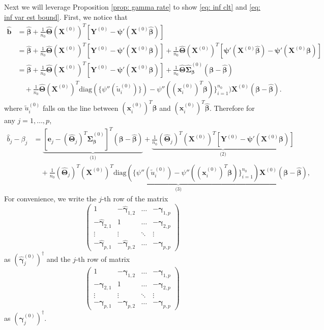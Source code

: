 \documentclass[12pt]{article}
\newcommand{\hb}{\hat{b}}
\newcommand{\diag}{\text{diag}}
\newcommand{\bbeta}{\bm{\beta}}
\newcommand{\hbeta}{\hat{\bm{\beta}}}
\newcommand{\bgamma}{\bm{\gamma}}
\newcommand{\bgammak}[1]{\bm{\gamma}^{(#1)}}
\newcommand{\hbgammak}[1]{\hat{\bm{\gamma}}^{(#1)}}
\newcommand{\hgamma}{\hat{\bm{\gamma}}}
\newcommand{\bxk}[1]{\bm{x}^{(#1)}}
\newcommand{\bXk}[1]{\bm{X}^{(#1)}}
\newcommand{\bpsi}{\bm{\psi}}
\newcommand{\<}{\langle}
\renewcommand{\>}{\rangle}
\newcommand{\hTheta}{\widehat{\bm{\Theta}}}
\newcommand{\hSigmak}[1]{\widehat{\bm{\Sigma}}^{(#1)}}
\begin{document}
Next we will leverage Proposition \ref{prop: gamma rate} to show \eqref{eq: inf clt} and \eqref{eq: inf var est bound}. First, we notice that
\begin{align}
	\hat{\bm{b}} &= \hbeta +\frac{1}{n_0}\hTheta(\bXk{0})^T[\bm{Y}^{(0)} - \bpsi'(\bXk{0}\hbeta)] \\
	&= \hbeta +\frac{1}{n_0}\hTheta(\bXk{0})^T[\bm{Y}^{(0)} - \bpsi'(\bXk{0}\bbeta)] + \frac{1}{n_0}\hTheta(\bXk{0})^T[\bpsi'(\bXk{0}\hbeta) - \bpsi'(\bXk{0}\bbeta)] \\
	&= \hbeta +\frac{1}{n_0}\hTheta(\bXk{0})^T[\bm{Y}^{(0)} - \bpsi'(\bXk{0}\bbeta)] + \frac{1}{n_0}\hTheta\hSigmak{0}_{\bbeta}(\bbeta - \hbeta) \\
	&\quad + \frac{1}{n_0}\hTheta(\bXk{0})^T\diag(\{\psi''(\tilde{u}_i^{(0)})\}) - \psi''((\bxk{0}_i)^T\bbeta)\}_{i=1}^{n_0})\bXk{0}(\bbeta - \hbeta).
\end{align}
where $\tilde{u}_i^{(0)}$ falls on the line between $(\bxk{0}_i)^T\bbeta$ and $(\bxk{0}_i)^T\hbeta$. Therefore for any $j = 1, \ldots, p$,
\begin{align}
	\hb_j - \beta_j &= \underbrace{\left[\bm{e}_j - (\hTheta_j)^T\hSigmak{0}_{\bbeta}\right]^T(\bbeta - \hbeta)}_\text{(1)} + \underbrace{\frac{1}{n_0}(\hTheta_j)^T(\bXk{0})^T[\bm{Y}^{(0)} - \bpsi'(\bXk{0}\bbeta)]}_\text{(2)} \\
	&\quad + \underbrace{\frac{1}{n_0}(\hTheta_j)^T(\bXk{0})^T\diag(\{\psi''(\tilde{u}_i^{(0)}) - \psi''((\bxk{0}_i)^T\bbeta)\}_{i=1}^{n_0})\bXk{0}(\bbeta - \hbeta)}_\text{(3)},
\end{align}
For convenience, we write the $j$-th row of the matrix
\begin{equation}
	\begin{pmatrix}
		1 &-\hgamma_{1,2} &\hdots  &-\hgamma_{1,p} \\
		-\hgamma_{2,1} &1 &\hdots  &-\hgamma_{2,p} \\
		\vdots &\vdots &\ddots &\vdots \\
		-\hgamma_{p,1} &-\hgamma_{p,2} &\hdots &-\hgamma_{p,p}
	\end{pmatrix}
\end{equation}
as $(\hbgammak{0}_j)^{\dagger}$ and the $j$-th row of matrix
\begin{equation}
	\begin{pmatrix}
		1 &-\bgamma_{1,2} &\hdots  &-\bgamma_{1,p} \\
		-\bgamma_{2,1} &1 &\hdots  &-\bgamma_{2,p} \\
		\vdots &\vdots &\ddots &\vdots \\
		-\bgamma_{p,1} &-\bgamma_{p,2} &\hdots &-\bgamma_{p,p}
	\end{pmatrix}
\end{equation}
as $(\bgammak{0}_j)^{\dagger}$. 
\end{document}
